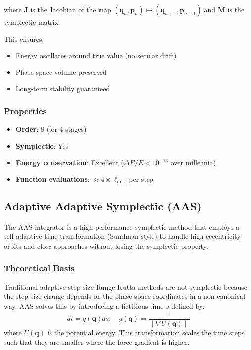 where $\mathbf{J}$ is the Jacobian of the map $(\mathbf{q}_n, \mathbf{p}_n) \mapsto (\mathbf{q}_{n+1}, \mathbf{p}_{n+1})$ and $\mathbf{M}$ is the symplectic matrix.

This ensures:
\begin{itemize}
    \item Energy oscillates around true value (no secular drift)
    \item Phase space volume preserved
    \item Long-term stability guaranteed
\end{itemize}

\subsubsection{Properties}

\begin{itemize}
    \item \textbf{Order}: 8 (for 4 stages)
    \item \textbf{Symplectic}: Yes
    \item \textbf{Energy conservation}: Excellent ($\Delta E/E < 10^{-15}$ over millennia)
    \item \textbf{Function evaluations}: $\approx 4 \times \ell_{\text{iter}}$ per step
\end{itemize}

\subsection{Adaptive Adaptive Symplectic (AAS)}
\label{subsec:aas_integrator}

The AAS integrator is a high-performance symplectic method that employs a self-adaptive time-transformation (Sundman-style) to handle high-eccentricity orbits and close approaches without losing the symplectic property.

\subsubsection{Theoretical Basis}

Traditional adaptive step-size Runge-Kutta methods are not symplectic because the step-size change depends on the phase space coordinates in a non-canonical way. AAS solves this by introducing a fictitious time $s$ defined by:
\begin{equation}
    dt = g(\mathbf{q}) ds, \quad g(\mathbf{q}) = \frac{1}{\|\nabla U(\mathbf{q})\|}
\end{equation}
where $U(\mathbf{q})$ is the potential energy. This transformation scales the time steps such that they are smaller where the force gradient is higher.

